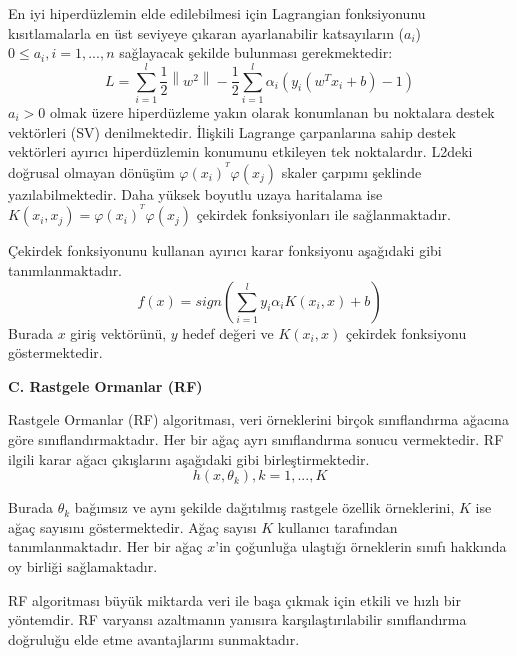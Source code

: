 	En iyi hiperdüzlemin elde edilebilmesi için Lagrangian fonksiyonunu kısıtlamalarla en üst seviyeye çıkaran ayarlanabilir katsayıların ($a_{i}$) $0\leq a_{i},i=1,...,n$ sağlayacak şekilde bulunması gerekmektedir:
	\begin{equation}
		L=\sum_{i=1}^{l}\frac{1}{2}\left \| w^{2} \right \|-\frac{1}{2}\sum_{i=1}^{l}\alpha _{i}(y_{i}(w^{T}x_{i}+b)-1)
	\end{equation}
	$a_{i}>0$ olmak üzere hiperdüzleme yakın olarak konumlanan bu noktalara destek vektörleri (SV) denilmektedir. İlişkili Lagrange çarpanlarına sahip destek vektörleri ayırıcı hiperdüzlemin konumunu etkileyen tek noktalardır. L2deki doğrusal olmayan dönüşüm $\varphi(x_{i})^{^T}\varphi(x_{j})$ skaler çarpımı şeklinde yazılabilmektedir. Daha yüksek boyutlu uzaya haritalama ise $K(x_{i},x_{j})=\varphi(x_{i})^{^T}\varphi(x_{j})$ çekirdek fonksiyonları ile sağlanmaktadır. 
	
	Çekirdek fonksiyonunu kullanan ayırıcı karar fonksiyonu aşağıdaki gibi tanımlanmaktadır. 
	\begin{equation}
		f(x)=sign(\sum_{i=1}^{l}y_{i}\alpha_{i}K(x_{i},x)+b)
	\end{equation}
	Burada $x$ giriş vektörünü, $y$ hedef değeri ve $K(x_{i},x)$ çekirdek fonksiyonu göstermektedir.
	
	\textbf{C. Rastgele Ormanlar (RF)}
	
	Rastgele Ormanlar (RF) algoritması, veri örneklerini birçok sınıflandırma ağacına göre sınıflandırmaktadır. Her bir ağaç ayrı sınıflandırma sonucu vermektedir. RF ilgili karar ağacı çıkışlarını aşağıdaki gibi birleştirmektedir.
	\begin{equation}
		h(x,\theta _{k}), k=1,...,K
	\end{equation}
	
	Burada $\theta _{k}$ bağımsız ve aynı şekilde dağıtılmış rastgele özellik örneklerini, $K$ ise ağaç sayısını göstermektedir. Ağaç sayısı $K$ kullanıcı tarafından tanımlanmaktadır. Her bir ağaç $x$'in çoğunluğa ulaştığı örneklerin sınıfı hakkında oy birliği sağlamaktadır. 
	
	RF algoritması büyük miktarda veri ile başa çıkmak için etkili ve hızlı bir yöntemdir. RF varyansı azaltmanın yanısıra karşılaştırılabilir sınıflandırma doğruluğu elde etme avantajlarını sunmaktadır.
	
	
